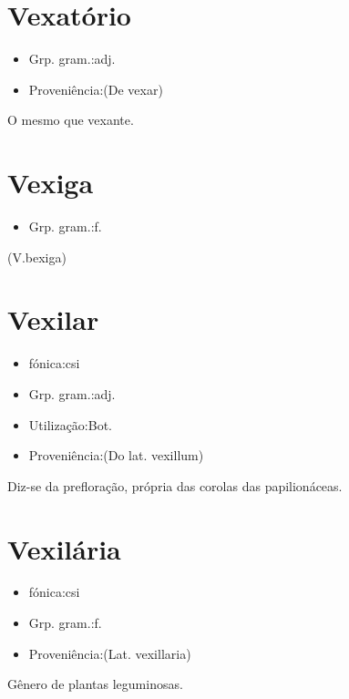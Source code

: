 \documentclass{article}
\begin{document}
\section{Vexatório}
\begin{itemize}
\item {Grp. gram.:adj.}
\end{itemize}
\begin{itemize}
\item {Proveniência:(De \textunderscore vexar\textunderscore )}
\end{itemize}
O mesmo que \textunderscore vexante\textunderscore .
\section{Vexiga}
\begin{itemize}
\item {Grp. gram.:f.}
\end{itemize}
(V.bexiga)
\section{Vexilar}
\begin{itemize}
\item {fónica:csi}
\end{itemize}
\begin{itemize}
\item {Grp. gram.:adj.}
\end{itemize}
\begin{itemize}
\item {Utilização:Bot.}
\end{itemize}
\begin{itemize}
\item {Proveniência:(Do lat. \textunderscore vexillum\textunderscore )}
\end{itemize}
Diz-se da prefloração, própria das corolas das papilionáceas.
\section{Vexilária}
\begin{itemize}
\item {fónica:csi}
\end{itemize}
\begin{itemize}
\item {Grp. gram.:f.}
\end{itemize}
\begin{itemize}
\item {Proveniência:(Lat. \textunderscore vexillaria\textunderscore )}
\end{itemize}
Gênero de plantas leguminosas.
\end{document}
